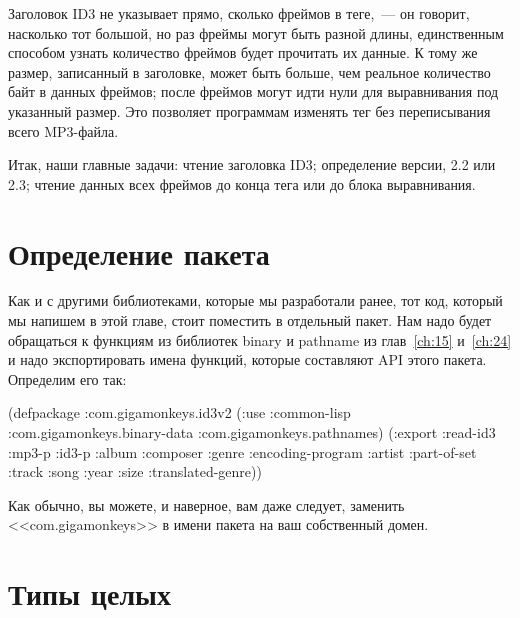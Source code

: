 Заголовок ID3 не указывает прямо, сколько фреймов в теге,~--- он говорит, насколько тот
большой, но раз фреймы могут быть разной длины, единственным способом узнать количество
фреймов будет прочитать их данные.  К тому же размер, записанный в заголовке, может быть
больше, чем реальное количество байт в данных фреймов; после фреймов могут идти нули для
выравнивания под указанный размер.  Это позволяет программам изменять тег без
переписывания всего MP3-файла.

Итак, наши главные задачи: чтение заголовка ID3; определение версии, 2.2 или 2.3; чтение
данных всех фреймов до конца тега или до блока выравнивания.

\section{Определение пакета}

Как и с другими библиотеками, которые мы разработали ранее, тот код, который мы напишем в
этой главе, стоит поместить в отдельный пакет.  Нам надо будет обращаться к функциям
из библиотек binary и pathname из глав~\ref{ch:15} и~\ref{ch:24} и надо экспортировать
имена функций, которые составляют API этого пакета.  Определим его так:

\begin{myverb}
(defpackage :com.gigamonkeys.id3v2
  (:use :common-lisp
        :com.gigamonkeys.binary-data
        :com.gigamonkeys.pathnames)
  (:export
   :read-id3
   :mp3-p
   :id3-p
   :album
   :composer
   :genre
   :encoding-program
   :artist
   :part-of-set
   :track
   :song
   :year
   :size
   :translated-genre))
\end{myverb}

Как обычно, вы можете, и наверное, вам даже следует, заменить <<com.gigamonkeys>> в имени
пакета на ваш собственный домен.

\section{Типы целых}

